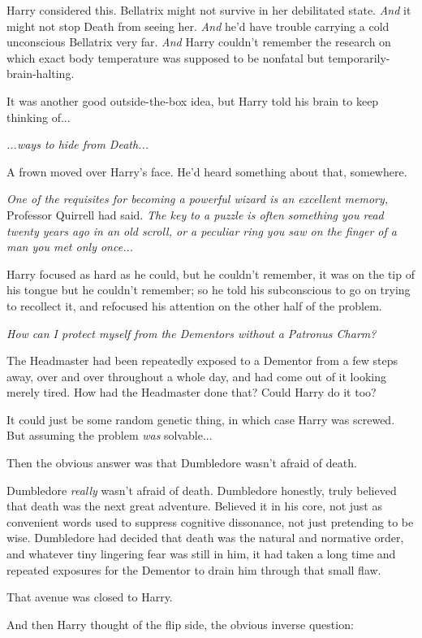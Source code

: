 Harry considered this. Bellatrix might not survive in her debilitated
state. \emph{And} it might not stop Death from seeing her. \emph{And}
he'd have trouble carrying a cold unconscious Bellatrix very far.
\emph{And} Harry couldn't remember the research on which exact body
temperature was supposed to be nonfatal but temporarily-brain-halting.

It was another good outside-the-box idea, but Harry told his brain to
keep thinking of...

\emph{...ways to hide from Death...}

A frown moved over Harry's face. He'd heard something about that,
somewhere.

\emph{One of the requisites for becoming a powerful wizard is an
excellent memory,} Professor Quirrell had said. \emph{The key to a
puzzle is often something you read twenty years ago in an old scroll, or
a peculiar ring you saw on the finger of a man you met only
once...}

Harry focused as hard as he could, but he couldn't remember, it was on
the tip of his tongue but he couldn't remember; so he told his
subconscious to go on trying to recollect it, and refocused his
attention on the other half of the problem.

\emph{How can I protect myself from the Dementors without a Patronus
Charm?}

The Headmaster had been repeatedly exposed to a Dementor from a few
steps away, over and over throughout a whole day, and had come out of it
looking merely tired. How had the Headmaster done that? Could Harry do
it too?

It could just be some random genetic thing, in which case Harry was
screwed. But assuming the problem \emph{was} solvable...

Then the obvious answer was that Dumbledore wasn't afraid of death.

Dumbledore \emph{really} wasn't afraid of death. Dumbledore honestly,
truly believed that death was the next great adventure. Believed it in
his core, not just as convenient words used to suppress cognitive
dissonance, not just pretending to be wise. Dumbledore had decided that
death was the natural and normative order, and whatever tiny lingering
fear was still in him, it had taken a long time and repeated exposures
for the Dementor to drain him through that small flaw.

That avenue was closed to Harry.

And then Harry thought of the flip side, the obvious inverse question:

